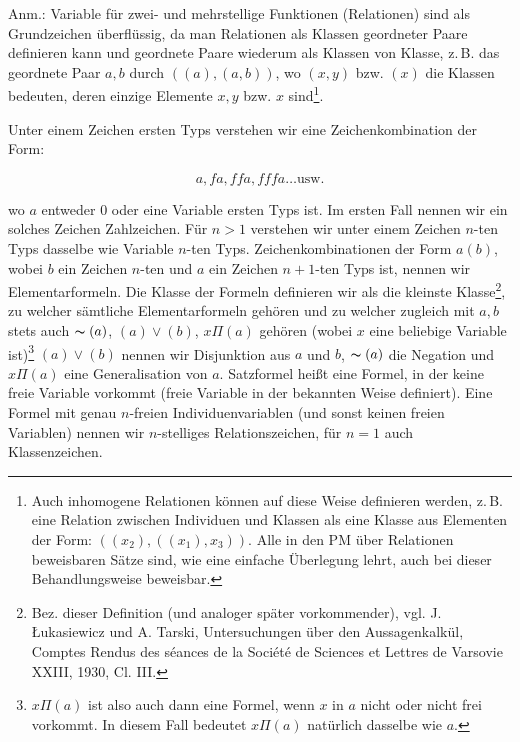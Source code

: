 \documentclass[draft]{scrartcl}
\newcommand{\fnachtzehna}{18a}
\let\oldleft\left
\let\oldright\right
\def\left#1{%
	    \global\advance\bracketnum1\relax 
		\colorlet{temp}{.}%
		    \csname bracketcolor\the\bracketnum\endcsname
			\oldleft#1%
			    \color{temp}%
	}
\def\right#1{%
	    \colorlet{temp}{.}%
		\csname bracketcolor\the\bracketnum\endcsname
		    \oldright#1%
			\global\advance\bracketnum-1\relax
			    \color{temp}%
	}
\def\left#1{#1}
\def\right#1{#1}
\begin{document}
Anm.: Variable für zwei- und mehrstellige Funktionen
(Relationen) sind als Grundzeichen überflüssig, da man
Relationen als Klassen geordneter Paare definieren kann
und geordnete Paare wiederum als Klassen von Klasse, z.\,B.
das geordnete Paar $a, b$ durch $\left(\left(a\right), 
\left(a, b\right)\right)$, wo $\left(x, y\right)$ bzw. $\left(x\right)$ die 
Klassen bedeuten, deren einzige Elemente $x, y$ bzw. $x$ 
sind\footnote{Auch inhomogene Relationen können auf diese 
Weise definieren werden, z.\,B. eine Relation zwischen 
Individuen und Klassen als eine Klasse aus Elementen 
der Form: $\left(\left(x_2\right), \left(\left(x_1\right), x_3\right)\right)$. 
Alle in den PM über Relationen beweisbaren Sätze sind, wie eine 
einfache Überlegung lehrt, auch bei dieser Behandlungsweise beweisbar.}.

Unter einem Zeichen ersten Typs verstehen wir eine Zeichenkombination der Form:

$$ a, fa, ffa, fffa \dots \text{usw.} $$

wo $a$ entweder 0 oder eine Variable ersten Typs ist.
Im ersten Fall nennen wir ein solches Zeichen Zahlzeichen.
Für $n > 1$ verstehen wir unter einem Zeichen $n$-ten
Typs dasselbe wie Variable $n$-ten Typs. 
Zeichenkombinationen der Form $a\left(b\right)$, wobei
$b$ ein Zeichen $n$-ten und $a$ ein Zeichen $n + 1$-ten 
Typs ist, nennen wir Elementarformeln. Die Klasse der 
Formeln definieren wir als die kleinste
Klasse\footnote{Bez. dieser Definition (und analoger 
später vorkommender), vgl. J. \L{}ukasiewicz und 
A. Tarski, Untersuchungen über den Aussagenkalkül, 
Comptes Rendus des s\'eances de la Soci\'et\'e de 
Sciences et Lettres de Varsovie XXIII, 1930, Cl. III.},
zu welcher sämtliche Elementarformeln gehören und zu
welcher zugleich mit $a, b$ stets auch 
$\thicksim\left(a\right)$, $\left(a\right)\lor\left(b\right)$, $x\Pi\left(a\right)$ gehören (wobei $x$ eine
\let\originalfootnote=\thefootnote
\let\thefootnote=\fnachtzehna
beliebige Variable ist)\footnote{$x\Pi\left(a\right)$ ist also auch dann eine 
Formel, wenn $x$ in $a$ nicht oder nicht frei vorkommt. In diesem 
Fall bedeutet $x\Pi\left(a\right)$ natürlich dasselbe wie $a$.}
\let\thefootnote=\originalfootnote
\setcounter{footnote}{19}
$\left(a\right)\lor\left(b\right)$ nennen wir Disjunktion aus $a$ und $b$, 
$\thicksim\left(a\right)$ die Negation und $x\Pi\left(a\right)$ eine Generalisation von 
$a$. Satzformel heißt eine Formel, in der keine freie Variable 
vorkommt (freie Variable in der bekannten Weise
definiert). Eine Formel mit genau $n$-freien 
Individuenvariablen (und sonst keinen freien Variablen)
nennen wir $n$-stelliges Relationszeichen, für $n = 1$
auch Klassenzeichen.
\end{document}
